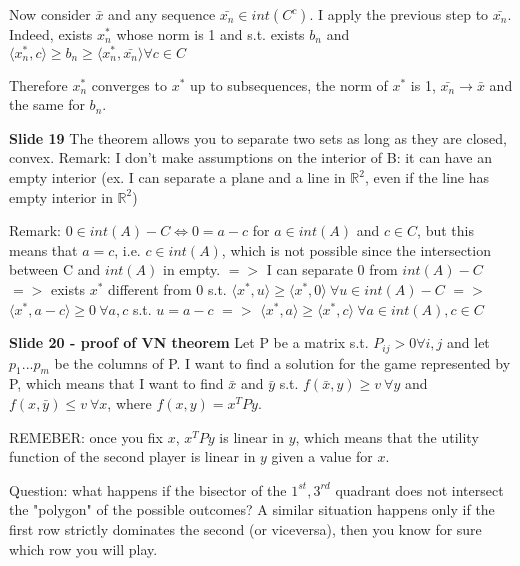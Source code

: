 \documentclass[pt11,a4paper,twoside,reqno,openright]{paper}
\begin{document}
\noindent Now consider $\bar{x}$ and any sequence $\bar{x_n} \in int(C^c)$. I apply the previous step to $\bar{x_n}$.
Indeed, exists $x_n^*$ whose norm is 1 and s.t. exists $b_n$ and
$\langle x_n^*,c \rangle \geq b_n \geq
 \langle x_n^*, \bar{x_n} \rangle \forall c \in C$

\noindent Therefore $x_n^*$ converges to $x^*$ up to subsequences, the norm of
$x^*$ is 1, $\bar{x_n} \rightarrow \bar{x}$ and the same for $b_n$.

\bigskip
\noindent \textbf{Slide 19}
The theorem allows you to separate two sets as long as they are closed,
convex.
Remark: I don't make assumptions on the interior of B: it can have an
empty interior (ex. I can separate a plane and a line in $\mathbb{R}^2$, even
if the line has empty interior in $\mathbb{R}^2$)

\noindent Remark: $0 \in int(A)-C \iff 0 = a-c$ for $a \in int(A)$ and 
$c \in C$, but
this means that $a = c$, i.e. $c \in int(A)$, which is not possible since
the intersection between C and $int(A)$ in empty.
$=>$
I can separate 0 from $int(A)-C$
$=>$
exists $x^*$ different from 0 s.t.
$\langle x^*,u \rangle \geq \langle x^*,0 \rangle ~\forall u \in int(A)-C$
$=>$
$\langle x^*, a-c  \rangle \geq 0 ~\forall a,c$ s.t. $u=a-c$
$=>$
$\langle x^*,a \rangle \geq \langle x^*,c \rangle ~\forall a \in int(A),
c \in C$

\noindent \textbf{Slide 20 - proof of VN theorem}
Let P be a matrix s.t. $P_{ij} > 0 \forall i,j$ and let $p_1...p_m$
be the columns of P.
I want to find a solution for the game represented by P, which means
that I want to find $\bar{x}$ and $\bar{y}$ s.t. $f(\bar{x},y) \geq v~
\forall y$ and $f(x,\bar{y}) \leq v ~\forall x$, where $f(x,y) = 
x^TPy$.


\noindent REMEBER: once you fix $x$, $x^TPy$ is linear in $y$, which means that
the utility function of the second player is linear in $y$ given a
value for $x$.

\noindent Question: what happens if the bisector of the $1^{st},3^{rd}$ 
quadrant does not intersect the "polygon" of the possible outcomes?
A similar situation happens only if the first row strictly dominates
the second (or viceversa), then you know for sure which row you will
play.
\end{document}
